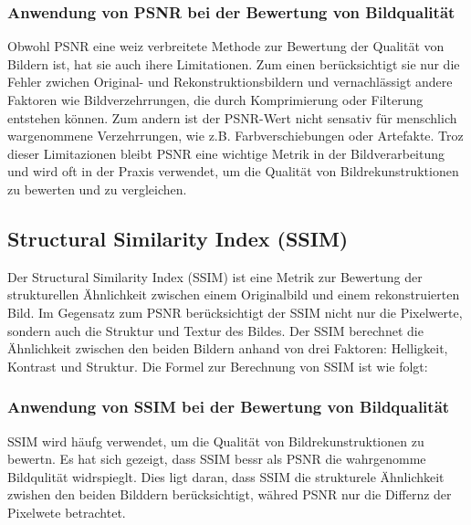         \subsubsection{Anwendung von PSNR bei der Bewertung von Bildqualität}
            Obwohl PSNR eine weiz verbreitete Methode zur Bewertung der Qualität von Bildern ist, hat sie auch ihere Limitationen.
            Zum einen berücksichtigt sie nur die Fehler zwichen Original- und Rekonstruktionsbildern und vernachlässigt andere Faktoren wie Bildverzehrrungen, die durch Komprimierung oder Filterung entstehen können.
            Zum andern ist der PSNR-Wert nicht sensativ für menschlich wargenommene Verzehrrungen, wie z.B. Farbverschiebungen oder Artefakte.
            Troz dieser Limitazionen bleibt PSNR eine wichtige Metrik in der Bildverarbeitung und wird oft in der Praxis verwendet, um die Qualität von Bildrekunstruktionen zu bewerten und zu vergleichen.
    \subsection{Structural Similarity Index (SSIM)}

        Der Structural Similarity Index (SSIM) ist eine Metrik zur Bewertung der strukturellen Ähnlichkeit zwischen einem Originalbild und einem rekonstruierten Bild. 
        Im Gegensatz zum PSNR berücksichtigt der SSIM nicht nur die Pixelwerte, sondern auch die Struktur und Textur des Bildes. 
        Der SSIM berechnet die Ähnlichkeit zwischen den beiden Bildern anhand von drei Faktoren: Helligkeit, Kontrast und Struktur. Die Formel zur Berechnung von SSIM ist wie folgt:
        \begin{equation}
        \end{equation}
        \subsubsection{Anwendung von SSIM bei der Bewertung von Bildqualität}
        
            SSIM wird häufg verwendet, um die Qualität von Bildrekunstruktionen zu bewertn. Es hat sich gezeigt, dass SSIM bessr als PSNR die wahrgenomme Bildqulität widrspieglt. 
            Dies ligt daran, dass SSIM die strukturele Ähnlichkeit zwishen den beiden Bilddern berücksichtigt, währed PSNR nur die Differnz der Pixelwete betrachtet.
